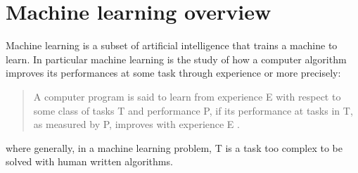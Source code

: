 



\section{Machine learning overview}
\label{sec:2ml}
Machine learning is a subset of artificial intelligence that trains a machine to learn. In particular machine learning is the study of how a computer algorithm improves its performances at some task through experience or more precisely:
\begin{quote}
    \centering
    A computer program is said to learn from experience E with respect to some class of tasks T and performance P, if its performance at tasks in T, as measured by P, improves with experience E \cite{mltm}.
\end{quote}
\noindent where generally, in a machine learning problem, T is a task too complex to be solved with human written algorithms.\\

